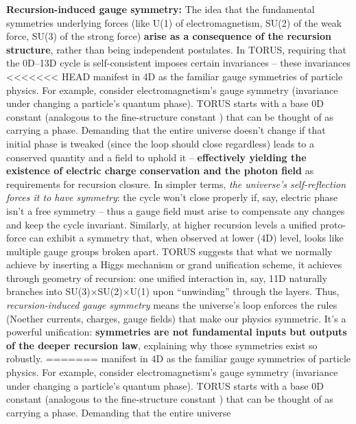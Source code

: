 \documentclass[]{article}
\begin{document}
{\textbf{Recursion-induced gauge symmetry:} The idea that the fundamental
symmetries underlying forces (like U(1) of electromagnetism, SU(2) of
the weak force, SU(3) of the strong force) \textbf{arise as a
consequence of the recursion structure}, rather than being independent
postulates. In TORUS, requiring that the 0D--13D cycle is
self-consistent imposes certain invariances -- these invariances
<<<<<<< HEAD
manifest in 4D as the familiar gauge symmetries of particle
physics\hspace{0pt}. For example, consider electromagnetism's gauge
symmetry (invariance under changing a particle's quantum phase). TORUS
starts with a base 0D constant (analogous to the fine-structure constant
\alpha) that can be thought of as carrying a phase. Demanding that the entire
universe doesn't change if that initial phase is tweaked (since the loop
should close regardless) leads to a conserved quantity and a field to
uphold it -- \textbf{effectively yielding the existence of electric
charge conservation and the photon field} as requirements for recursion
closure\hspace{0pt}. In simpler terms, \emph{the universe's
self-reflection forces it to have symmetry}: the cycle won't close
properly if, say, electric phase isn't a free symmetry -- thus a gauge
field must arise to compensate any changes and keep the cycle invariant.
Similarly, at higher recursion levels a unified proto-force can exhibit
a symmetry that, when observed at lower (4D) level, looks like multiple
gauge groups broken apart\hspace{0pt}. TORUS suggests that what we
normally achieve by inserting a Higgs mechanism or grand unification
scheme, it achieves through geometry of recursion: one unified
interaction in, say, 11D naturally branches into SU(3)×SU(2)×U(1) upon
``unwinding'' through the layers\hspace{0pt}. Thus,
\emph{recursion-induced gauge symmetry} means the universe's loop
enforces the rules (Noether currents, charges, gauge fields) that make
our physics symmetric. It's a powerful unification: \textbf{symmetries
are not fundamental inputs but outputs of the deeper recursion law},
explaining why those symmetries exist so robustly.
=======
manifest in 4D as the familiar gauge symmetries of particle physics​.
For example, consider electromagnetism's gauge symmetry (invariance
under changing a particle's quantum phase). TORUS starts with a base 0D
constant (analogous to the fine-structure constant \alpha) that can be
thought of as carrying a phase. Demanding that the entire universe
}
\end{document}
